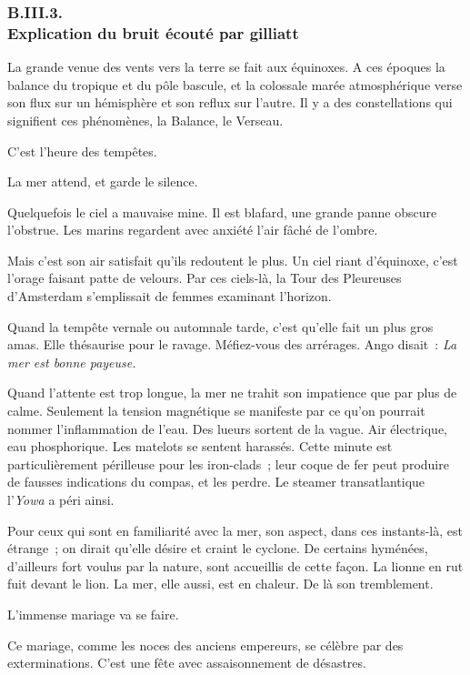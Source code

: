 \documentclass[french,twoside]{book} %
\begin{document}
 \subsubsection[{B.III.3. Explication du bruit écouté par gilliatt}]{B.III.3. \\
Explication du bruit écouté par gilliatt}
\noindent La grande venue des vents vers la terre se fait aux équinoxes. A ces époques la balance du tropique et du pôle bascule, et la colossale marée atmosphérique verse son flux sur un hémisphère et son reflux sur l’autre. Il y a des constellations qui signifient ces phénomènes, la Balance, le Verseau.\par
C’est l’heure des tempêtes.\par
La mer attend, et garde le silence.\par
Quelquefois le ciel a mauvaise mine. Il est blafard, une grande panne obscure l’obstrue. Les marins regardent avec anxiété l’air fâché de l’ombre.\par
Mais c’est son air satisfait qu’ils redoutent le plus. Un ciel riant d’équinoxe, c’est l’orage faisant patte de velours. Par ces ciels-là, la Tour des Pleureuses d’Amsterdam s’emplissait de femmes examinant l’horizon.\par
Quand la tempête vernale ou automnale tarde, c’est qu’elle fait un plus gros amas. Elle thésaurise pour le  ravage. Méfiez-vous des arrérages. Ango disait : \emph{La mer est bonne payeuse.}\par
Quand l’attente est trop longue, la mer ne trahit son impatience que par plus de calme. Seulement la tension magnétique se manifeste par ce qu’on pourrait nommer l’inflammation de l’eau. Des lueurs sortent de la vague. Air électrique, eau phosphorique. Les matelots se sentent harassés. Cette minute est particulièrement périlleuse pour les iron-clads ; leur coque de fer peut produire de fausses indications du compas, et les perdre. Le steamer transatlantique l’\emph{Yowa} a péri ainsi.\par
Pour ceux qui sont en familiarité avec la mer, son aspect, dans ces instants-là, est étrange ; on dirait qu’elle désire et craint le cyclone. De certains hyménées, d’ailleurs fort voulus par la nature, sont accueillis de cette façon. La lionne en rut fuit devant le lion. La mer, elle aussi, est en chaleur. De là son tremblement.\par
L’immense mariage va se faire.\par
Ce mariage, comme les noces des anciens empereurs, se célèbre par des exterminations. C’est une fête avec assaisonnement de désastres.\par
\end{document}
